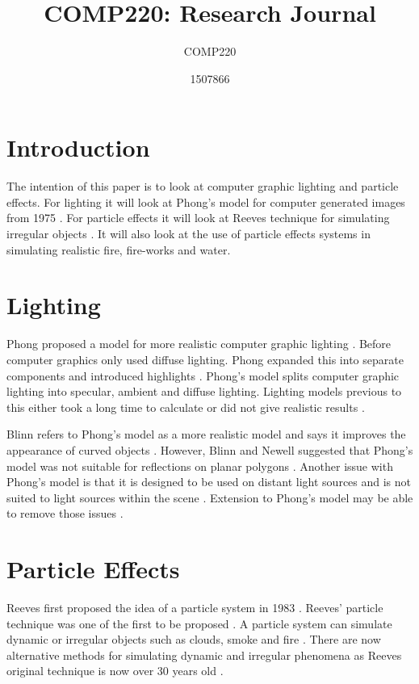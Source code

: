 \documentclass{scrartcl}
\title{COMP220: Research Journal}
\subtitle{COMP220}
\author{1507866}
\begin{document}
	
\maketitle
{}
	
\section{Introduction}
The intention of this paper is to look at computer graphic lighting and particle effects. For lighting it will look at Phong's model for computer generated images from 1975 \cite{Phong}.  For particle effects it will look at Reeves technique for simulating irregular objects \cite{Reeves}.
It will also look at the use of particle effects systems in simulating realistic fire, fire-works and water.  

\section{Lighting}
Phong proposed a model for more realistic computer graphic lighting \cite{Phong}. 
Before computer graphics only used diffuse lighting.  Phong expanded this into separate components and introduced highlights \cite{Kajiya, BlinnNewell, Phong}.  Phong's model splits computer graphic lighting into specular, ambient and diffuse lighting.  Lighting models previous to this either took a long time to calculate or did not give realistic results \cite{Phong}.

Blinn refers to Phong's model as a more realistic model and says it improves the appearance of curved objects \cite{Blinn}.  However, Blinn and Newell suggested that Phong's model was not suitable for reflections on planar polygons \cite{BlinnNewell}.   Another issue with Phong's model is that it is designed to be used on distant light sources and is not suited to light sources within the scene \cite{Whitted}.   Extension to Phong's model may be able to remove those issues \cite{BlinnNewell, Whitted}.

	
\section{Particle Effects}
Reeves first proposed the idea of a particle system in 1983 \cite{Reeves}.  Reeves' particle technique was one of the first to be proposed \cite{Pegoraro}.  
A particle system can simulate dynamic or irregular objects such as clouds, smoke and fire \cite{Reeves, Lei, Nishita}. 
There are now alternative methods for simulating dynamic and irregular phenomena as Reeves original technique is now over 30 years old  \cite{Nishita, Pegoraro}.
\end{document}
